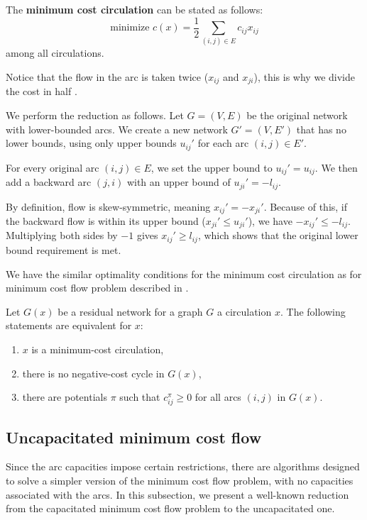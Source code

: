 \begin{defn}
    The \textbf{minimum cost circulation} can be stated as follows:
    \[
    \text{minimize }c(x) = \frac{1}{2}\sum_{(i,j)\in E} c_{ij}x_{ij} 
    \]
    among all circulations.
\end{defn}

Notice that the flow in the arc is taken twice ($x_{ij}$ and $x_{ji}$), this is why we divide the cost in half .

We perform the reduction as follows. Let $G = (V, E)$ be the original network with lower-bounded arcs. We create a new network $G' = (V, E')$ that has no lower bounds, using only upper bounds $u_{ij}'$ for each arc $(i,j) \in E'$. 

For every original arc $(i, j) \in E$, we set the upper bound to $u_{ij}' = u_{ij}$. We then add a backward arc $(j, i)$ with an upper bound of $u_{ji}' = -l_{ij}$. 

By definition, flow is skew-symmetric, meaning $x_{ij}' = -x_{ji}'$. Because of this, if the backward flow is within its upper bound ($x_{ji}' \leq u_{ji}'$), we have $-x_{ij}' \leq -l_{ij}$. Multiplying both sides by $-1$ gives $x_{ij}' \geq l_{ij}$, which shows that the original lower bound requirement is met.

We have the similar optimality conditions for the minimum cost circulation as for minimum cost flow problem described in .
\begin{theorem}
    Let $G(x)$ be a residual network for a graph $G$ a circulation $x$. 
    The following statements are equivalent for $x$:
    \begin{enumerate}
        \item $x$ is a minimum-cost circulation,
        \item there is no negative-cost cycle in $G(x)$,
        \item there are potentials $\pi$ such that $c_{ij}^\pi \geq 0$ for all arcs $(i,j)$ in $G(x)$.
    \end{enumerate}
\end{theorem}

\subsection{Uncapacitated minimum cost flow}
\label{sec:uncapacitated}
Since the arc capacities impose certain restrictions, there are algorithms designed to solve a simpler version of the minimum cost flow problem, with no capacities associated with the arcs. In this subsection, we present a well-known reduction from the capacitated minimum cost flow problem to the uncapacitated one.


